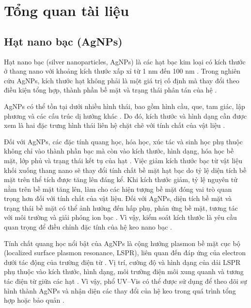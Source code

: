 \chapter{Tổng quan tài liệu}

\section{Hạt nano bạc (AgNPs)}
Hạt nano bạc (silver nanoparticles, AgNPs) là các hạt bạc kim loại có kích thước ở thang nano với khoảng kích thước xấp xỉ từ 1 nm đến 100 nm \parencite{iso14786}.
Trong nghiên cứu AgNPs, kích thước hạt không phải là một giá trị cố định mà thay đổi theo điều kiện tổng hợp, thành phần bề mặt và trạng thái phân tán của hệ \parencite{duman2024}.
\par
AgNPs có thể tồn tại dưới nhiều hình thái, bao gồm hình cầu, que, tam giác, lập phương và các cấu trúc dị hướng khác \parencite{duman2024,mota2020}.
Do đó, kích thước và hình dạng cần được xem là hai đặc trưng hình thái liên hệ chặt chẽ với tính chất của vật liệu \parencite{kelly2003,mota2020}.
\par
Đối với AgNPs, các đặc tính quang học, hóa học, xúc tác và sinh học phụ thuộc không chỉ vào thành phần bạc mà còn vào kích thước, hình dạng, hóa học bề mặt, lớp phủ và trạng thái kết tụ của hạt \parencite{duman2024}.
Việc giảm kích thước bạc từ vật liệu khối xuống thang nano sẽ thay đổi tính chất bề mặt hạt bạc do tỷ lệ diện tích bề mặt trên thể tích được tăng lên đáng kể.
Khi kích thước giảm, tỷ lệ nguyên tử nằm trên bề mặt tăng lên, làm cho các hiện tượng bề mặt đóng vai trò quan trọng hơn đối với tính chất của vật liệu.
Đối với AgNPs, diện tích bề mặt và trạng thái bề mặt có thể ảnh hưởng đến hấp phụ, phản ứng bề mặt, tương tác với môi trường và giải phóng ion bạc \parencite{duman2024}.
Vì vậy, kiểm soát kích thước là yêu cầu quan trọng để điều chỉnh đặc tính của hệ keo nano bạc \parencite{wuithschick2013}.
\par
Tính chất quang học nổi bật của AgNPs là cộng hưởng plasmon bề mặt cục bộ (localized surface plasmon resonance, LSPR), liên quan đến đáp ứng của electron dưới tác động của trường điện từ \parencite{kelly2003}.
Vị trí, cường độ và hình dạng của dải LSPR phụ thuộc vào kích thước, hình dạng, môi trường điện môi xung quanh và tương tác điện từ giữa các hạt \parencite{kelly2003,mulvaney1996}.
Vì vậy, phổ UV--Vis có thể được sử dụng để theo dõi sự hình thành AgNPs và nhận diện các thay đổi của hệ keo trong quá trình tổng hợp hoặc bảo quản \parencite{kelly2003,mulvaney1996}.
\par
